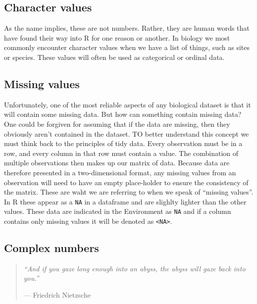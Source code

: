 \documentclass[english,10pt,a4paper,oneside]{book}
\theoremstyle{definition}
\theoremstyle{definition}
\theoremstyle{definition}
\theoremstyle{remark}
\begin{document}
\hypertarget{character-values}{%
\subsection{Character values}\label{character-values}}

As the name implies, these are not numbers. Rather, they are human words
that have found their way into R for one reason or another. In biology
we most commonly encounter character values when we have a list of
things, such as sites or species. These values will often be used as
categorical or ordinal data.

\hypertarget{missing-values}{%
\subsection{Missing values}\label{missing-values}}

Unfortunately, one of the most reliable aspects of any biological
dataset is that it will contain some missing data. But how can something
contain missing data? One could be forgiven for assuming that if the
data are missing, then they obviously aren't contained in the dataset.
TO better understand this concept we must think back to the principles
of tidy data. Every observation must be in a row, and every column in
that row must contain a value. The combination of multiple observations
then makes up our matrix of data. Because data are therefore presented
in a two-dimensional format, any missing values from an observation will
need to have an empty place-holder to ensure the consistency of the
matrix. These are waht we are referring to when we speak of
\enquote{missing values}. In R these appear as a \texttt{NA} in a
dataframe and are slighlty lighter than the other values. These data are
indicated in the Environment as \texttt{NA} and if a column contains
only missing values it will be denoted as
\texttt{\textless{}NA\textgreater{}}.

\hypertarget{complex-numbers}{%
\subsection{Complex numbers}\label{complex-numbers}}

\begin{quote}
\emph{\enquote{And if you gaze long enough into an abyss, the abyss will
gaze back into you.}}

--- Friedrich Nietzsche
\end{quote}
\end{document}
